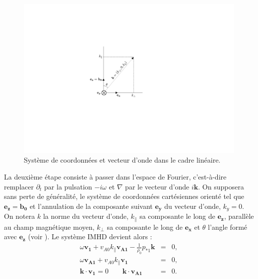 \label{sec-112}
\begin{figure}
 \centering
\includegraphics[width=0.6\linewidth,trim=9.3cm 7.8cm 13cm 7cm, clip=true]{./Part_1/images/schema_kplan.pdf}
\caption{Système de coordonnées et vecteur d'onde dans le cadre linéaire.}
\label{fig:schema_kplan}
\end{figure}

La deuxième étape consiste à passer dans l'espace de Fourier, c'est-à-dire remplacer $\partial_t$ par la pulsation $-i\omega$ et $\nabla$ par le vecteur d'onde $i\boldsymbol{k}$. On supposera sans perte de généralité, le système de coordonnées cartésiennes orienté tel que $\boldsymbol{e_z} = \boldsymbol{b_0}$ et l'annulation de la composante suivant $\boldsymbol{e_y}$ du vecteur d'onde, $k_y = 0$. On notera $k$ la norme du vecteur d'onde, $k_{\parallel}$ sa composante le long de $\boldsymbol{e_z}$, parallèle au champ magnétique moyen, $k_{\perp}$ sa composante le long de $\boldsymbol{e_x}$ et $\theta$ l'angle formé avec $\boldsymbol{e_z}$ (voir ).
Le système \acs{IMHD} devient alors : 
\begin{eqnarray}
 \label{eq:lin_inc_v} \omega \boldsymbol{v_{1}}  + v_{A0} k_{\parallel} \boldsymbol{v_{A1}} - \frac{1}{\rho_0}  p_{*1} \boldsymbol{k}&=& 0 ,\\
 \label{eq:lin_inc_b} \omega \boldsymbol{v_{A1}}  +  v_{A0} k_{\parallel}  \boldsymbol{v_{1}}&=& 0 ,\\
 \label{eq:lin_inc_r} \boldsymbol{k} \cdot \boldsymbol{v_{1}} = 0 \qquad \boldsymbol{k} \cdot \boldsymbol{v_{A1}}  &=& 0 .
\end{eqnarray}

